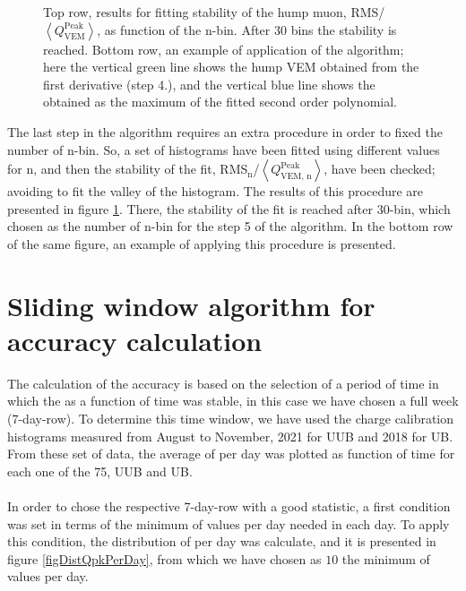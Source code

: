 \documentclass[twoside, final, 10pt]{articleMine}
\begin{document}
\begin{figure}[!t]
  \label{figFitStabNbins}
  \centering
  \caption{Top row, results for fitting stability of the hump
  muon, RMS/$\left<Q^\mathrm{Peak}_\mathrm{VEM}\right>$, as
  function of the n-bin. After 30 bins the stability is reached.
  Bottom row, an example of application of the algorithm; here
  the vertical green line shows the hump VEM obtained from the
  first derivative (step 4.), and the vertical blue line shows
  the \qpkvem obtained as the maximum of the fitted second order
  polynomial.}
  \label{figFitStabNbins}
\end{figure}

The last step in the algorithm requires an extra procedure in
order to fixed the number of n-bin. So, a set of histograms have
been fitted using different values for n, and then the stability
of the fit,
RMS$_\mathrm{n}$/$\left<Q^\mathrm{Peak}_\mathrm{VEM,\,n}
\right>$, have been checked; avoiding to fit the valley of the
histogram. The results of this procedure are presented in
figure \ref{figFitStabNbins}. There, the stability of the fit is
reached after 30-bin, which chosen as the number of n-bin for the
step 5 of the algorithm. In the bottom row of the same figure, an
example of applying this procedure is
presented.

\section{Sliding window algorithm for \qpkvem accuracy
calculation}
\label{secSlidWindowAlgo}

The calculation of the accuracy is based on the selection of a
period of time in which the \qpkvem as a function of time was
stable, in this case we have chosen a full week (7-day-row). To
determine this time window, we have used the charge calibration
histograms measured from August to November, 2021 for UUB and
2018 for UB. From these set of data, the average of \qpkvem per
day was plotted as function of time for each one of the 75, UUB
and UB.\\\\In order to chose the respective 7-day-row with a good
statistic, a first condition was set in terms of the minimum of
\qpkvem values per day needed in each day. To apply this
condition, the distribution of \qpkvem per day was calculate, and
it is presented in figure \ref{figDistQpkPerDay}, from which we
have chosen as $10$ the minimum of \qpkvem values per day.
\clearpage
\end{document}
